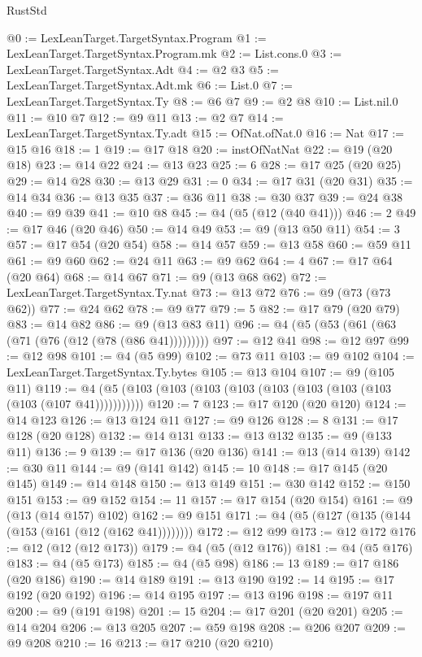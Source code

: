 \begin{lexlean}{RustStd}
\begin{coremodule}
@0 := LexLeanTarget.TargetSyntax.Program
@1 := LexLeanTarget.TargetSyntax.Program.mk
@2 := List.cons.{0}
@3 := LexLeanTarget.TargetSyntax.Adt
@4 := @2 @3
@5 := LexLeanTarget.TargetSyntax.Adt.mk
@6 := List.{0}
@7 := LexLeanTarget.TargetSyntax.Ty
@8 := @6 @7
@9 := @2 @8
@10 := List.nil.{0}
@11 := @10 @7
@12 := @9 @11
@13 := @2 @7
@14 := LexLeanTarget.TargetSyntax.Ty.adt
@15 := OfNat.ofNat.{0}
@16 := Nat
@17 := @15 @16
@18 := 1
@19 := @17 @18
@20 := instOfNatNat
@22 := @19 (@20 @18)
@23 := @14 @22
@24 := @13 @23
@25 := 6
@28 := @17 @25 (@20 @25)
@29 := @14 @28
@30 := @13 @29
@31 := 0
@34 := @17 @31 (@20 @31)
@35 := @14 @34
@36 := @13 @35
@37 := @36 @11
@38 := @30 @37
@39 := @24 @38
@40 := @9 @39
@41 := @10 @8
@45 := @4 (@5 (@12 (@40 @41)))
@46 := 2
@49 := @17 @46 (@20 @46)
@50 := @14 @49
@53 := @9 (@13 @50 @11)
@54 := 3
@57 := @17 @54 (@20 @54)
@58 := @14 @57
@59 := @13 @58
@60 := @59 @11
@61 := @9 @60
@62 := @24 @11
@63 := @9 @62
@64 := 4
@67 := @17 @64 (@20 @64)
@68 := @14 @67
@71 := @9 (@13 @68 @62)
@72 := LexLeanTarget.TargetSyntax.Ty.nat
@73 := @13 @72
@76 := @9 (@73 (@73 @62))
@77 := @24 @62
@78 := @9 @77
@79 := 5
@82 := @17 @79 (@20 @79)
@83 := @14 @82
@86 := @9 (@13 @83 @11)
@96 := @4 (@5 (@53 (@61 (@63 (@71 (@76 (@12 (@78 (@86 @41)))))))))
@97 := @12 @41
@98 := @12 @97
@99 := @12 @98
@101 := @4 (@5 @99)
@102 := @73 @11
@103 := @9 @102
@104 := LexLeanTarget.TargetSyntax.Ty.bytes
@105 := @13 @104
@107 := @9 (@105 @11)
@119 := @4 (@5 (@103 (@103 (@103 (@103 (@103 (@103 (@103 (@103 (@103 (@107 @41)))))))))))
@120 := 7
@123 := @17 @120 (@20 @120)
@124 := @14 @123
@126 := @13 @124 @11
@127 := @9 @126
@128 := 8
@131 := @17 @128 (@20 @128)
@132 := @14 @131
@133 := @13 @132
@135 := @9 (@133 @11)
@136 := 9
@139 := @17 @136 (@20 @136)
@141 := @13 (@14 @139)
@142 := @30 @11
@144 := @9 (@141 @142)
@145 := 10
@148 := @17 @145 (@20 @145)
@149 := @14 @148
@150 := @13 @149
@151 := @30 @142
@152 := @150 @151
@153 := @9 @152
@154 := 11
@157 := @17 @154 (@20 @154)
@161 := @9 (@13 (@14 @157) @102)
@162 := @9 @151
@171 := @4 (@5 (@127 (@135 (@144 (@153 (@161 (@12 (@162 @41))))))))
@172 := @12 @99
@173 := @12 @172
@176 := @12 (@12 (@12 @173))
@179 := @4 (@5 (@12 @176))
@181 := @4 (@5 @176)
@183 := @4 (@5 @173)
@185 := @4 (@5 @98)
@186 := 13
@189 := @17 @186 (@20 @186)
@190 := @14 @189
@191 := @13 @190
@192 := 14
@195 := @17 @192 (@20 @192)
@196 := @14 @195
@197 := @13 @196
@198 := @197 @11
@200 := @9 (@191 @198)
@201 := 15
@204 := @17 @201 (@20 @201)
@205 := @14 @204
@206 := @13 @205
@207 := @59 @198
@208 := @206 @207
@209 := @9 @208
@210 := 16
@213 := @17 @210 (@20 @210)

\end{coremodule}
\end{lexlean}
